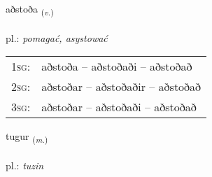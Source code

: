 \documentclass[frontgrid, backgrid]{flacards}\usepackage[]{graphicx}\usepackage[]{xcolor}
\begin{document}
\renewcommand{\flhead}{\vskip5pt \fboxsep=0pt {\small\bfseries\footnotesize Sagnorð | Verb}}
\renewcommand{\fcfoot}{\vskip5pt \fboxsep=0pt \hspace{2pt}{\small\bfseries\footnotesize 2K}}

\renewcommand{\blhead}{\vskip5pt {\small\bfseries\footnotesize Sagnorð | Verb }}
\renewcommand{\bcfoot}{\vskip5pt \hspace{2pt}{\small\bfseries\footnotesize 2K}}


{aðstoða \small{\textsubscript{(\textit{v.})}} \\[1ex] %
\textphonetic{[aðstɔða]} \\
pl.: \emph{pomagać, asystować} \\  [2ex]
\renewcommand*{\arraystretch}{0.8}
\begin{tabular}{p{1cm}l}
\textsc{1sg}: & aðstoða -- aðstoðaði -- aðstoðað \\ 
\textsc{2sg}: & aðstoðar -- aðstoðaðir -- aðstoðað \\ 
\textsc{3sg}: & aðstoðar -- aðstoðaði -- aðstoðað \\ 
\end{tabular}
}

\renewcommand{\flhead}{\vskip5pt \fboxsep=0pt {\small\bfseries\footnotesize Nafnorð | Noun}}
\renewcommand{\fcfoot}{\vskip5pt \fboxsep=0pt \hspace{2pt}{\small\bfseries\footnotesize 2K}}

\renewcommand{\blhead}{\vskip5pt {\small\bfseries\footnotesize Nafnorð | Noun }}
\renewcommand{\bcfoot}{\vskip5pt \hspace{2pt}{\small\bfseries\footnotesize 2K}}


{tugur \small{\textsubscript{(\textit{m.})}} \\[1ex] %
\textphonetic{[tʰʏːɣʏr]} \\
pl.: \emph{tuzin} \\  [2ex]
\renewcommand*{\arraystretch}{0.8}
}
\end{document}
